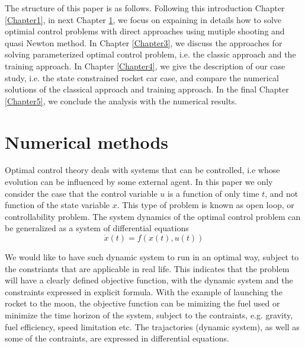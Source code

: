 \documentclass  [
  paper    = a4,
  BCOR     = 10mm,
  twoside,
  fontsize = 12pt,
  fleqn,
  toc      = bibnumbered,
  toc      = listofnumbered,
  numbers  = noendperiod,
  headings = normal,
  listof   = leveldown,
  version  = 3.03
]                                       {scrreprt}
\newcommand{\<}{\langle}
\renewcommand{\>}{\rangle}
\begin{document}
The structure of this paper is as follows. Following this introduction Chapter \ref{Chapter1}, in next Chapter \ref{Chapter2}, we focus on expaining in details how to solve optimial control problems with direct approaches using mutiple shooting and quasi Newton method. In Chapter \ref{Chapter3}, we discuss the approaches for solving parameterized optimal control problem, i.e. the classic approach and the training approach.  In Chapter \ref{Chapter4}, we give the description of our case study, i.e. the state constrained rocket car case, and compare the numerical solutions of the classical approach and training approach. In the final Chapter \ref{Chapter5}, we conclude the analysis with the numerical results. 




\chapter{Numerical methods}
\label{Chapter2}
Optimal control theory deals with systems that can be controlled, i.e whose evolution can be influenced by some external agent. In this paper we only consider the case that the control variable $u$ is a function of only time $t$, and not function of the state variable $x$. This type of problem is known as open loop, or controllability problem. The system dynamics of the optimal control problem can be generalized as a system of differential equations 
\begin{equation}
	  \dot{x} (t) = f(x(t), u(t))
\end{equation}	  

We would like to have such dynamic system to run in an optimal way, subject to the constriants that are applicable in real life. This indicates that the problem will have a clearly defined objective function, with the dynamic system and the constraints expressed in explicit formula. With the example of launching the rocket to the moon, the objective function can be mimizing the fuel used or minimize the time horizon of the system, subject to the contraints, e.g. gravity, fuel efficiency, speed limitation etc. The trajactories (dynamic system), as well as some of the contraints, are expressed in differential equations.  
\end{document}
